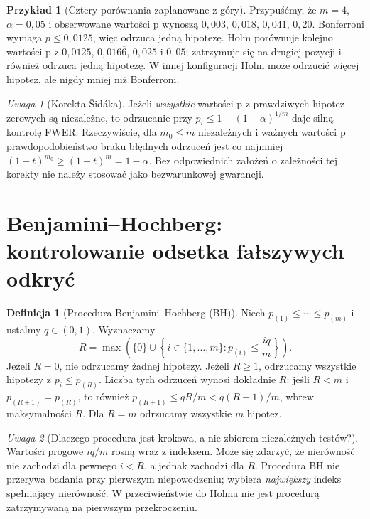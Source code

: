 \documentclass[11pt,a4paper,oneside]{report}
\numberwithin{equation}{chapter}
\theoremstyle{plain}
\theoremstyle{definition}
\newtheorem{definicja}{Definicja}[chapter]
\newtheorem{przyklad}{Przykład}[chapter]
\theoremstyle{remark}
\newtheorem{uwaga}{Uwaga}[chapter]
\begin{document}
\begin{przyklad}[Cztery porównania zaplanowane z góry]
Przypuśćmy, że $m=4$, $\alpha=0{,}05$ i obserwowane
wartości p wynoszą
$0{,}003$, $0{,}018$, $0{,}041$, $0{,}20$.
Bonferroni wymaga $p\le0{,}0125$, więc odrzuca
jedną hipotezę. Holm porównuje kolejno wartości p z
$0{,}0125$, $0{,}016\overline6$, $0{,}025$ i
$0{,}05$; zatrzymuje się na drugiej pozycji i również
odrzuca jedną hipotezę. W innej konfiguracji Holm może
odrzucić więcej hipotez, ale nigdy mniej niż Bonferroni.
\end{przyklad}

\begin{uwaga}[Korekta Šidáka]
Jeżeli \emph{wszystkie} wartości p z prawdziwych hipotez
zerowych są niezależne, to odrzucanie przy
$p_i\le1-(1-\alpha)^{1/m}$ daje silną kontrolę FWER.
Rzeczywiście, dla $m_0\le m$ niezależnych i ważnych
wartości p prawdopodobieństwo braku błędnych odrzuceń
jest co najmniej $(1-t)^{m_0}\ge(1-t)^m=1-\alpha$.
Bez odpowiednich założeń o zależności tej korekty nie
należy stosować jako bezwarunkowej gwarancji.
\end{uwaga}

\section{Benjamini--Hochberg: kontrolowanie odsetka fałszywych odkryć}
\begin{definicja}[Procedura Benjamini--Hochberg (BH)]
\label{def:bh}
Niech $p_{(1)}\le\cdots\le p_{(m)}$ i ustalmy
$q\in(0,1)$. Wyznaczamy
\[
 R=\max\left(\{0\}\cup
 \left\{i\in\{1,\ldots,m\}:
 p_{(i)}\le\frac{iq}{m}\right\}\right).
\]
Jeżeli $R=0$, nie odrzucamy żadnej hipotezy.
Jeżeli $R\ge1$, odrzucamy wszystkie hipotezy z
$p_i\le p_{(R)}$. Liczba tych odrzuceń wynosi dokładnie
$R$: jeśli $R<m$ i $p_{(R+1)}=p_{(R)}$, to również
$p_{(R+1)}\le qR/m<q(R+1)/m$, wbrew maksymalności $R$.
Dla $R=m$ odrzucamy wszystkie $m$ hipotez.
\end{definicja}

\begin{uwaga}[Dlaczego procedura jest krokowa, a nie zbiorem
niezależnych testów?]
Wartości progowe $iq/m$ rosną wraz z indeksem.
Może się zdarzyć, że nierówność nie zachodzi dla pewnego
$i<R$, a jednak zachodzi dla $R$. Procedura BH nie
przerywa badania przy pierwszym niepowodzeniu; wybiera
\emph{największy} indeks spełniający nierówność.
W przeciwieństwie do Holma nie jest procedurą
zatrzymywaną na pierwszym przekroczeniu.
\end{uwaga}
\end{document}
